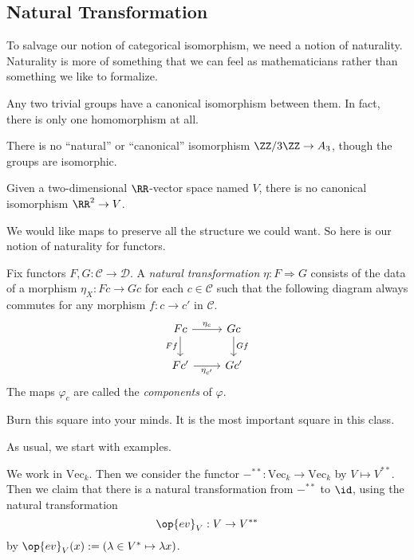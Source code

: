 \subsection{Natural Transformation}
To salvage our notion of categorical isomorphism, we need a notion of naturality. Naturality is more of something that we can feel as mathematicians rather than something we like to formalize.
\begin{example}
	Any two trivial groups have a canonical isomorphism between them. In fact, there is only one homomorphism at all.
\end{example}
\begin{nex}
	There is no ``natural'' or ``canonical'' isomorphism $\ZZ/3\ZZ\to A_3$, though the groups are isomorphic.
\end{nex}
\begin{nex}
	Given a two-dimensional $\RR$-vector space named $V$, there is no canonical isomorphism $\RR^2\to V$.
\end{nex}
We would like maps to preserve all the structure we could want. So here is our notion of naturality for functors.
\begin{definition}
	Fix functors $F,G:\mathcal C\to\mathcal D$. A \textit{natural transformation} $\eta:F\Rightarrow G$ consists of the data of a morphism $\eta_X:Fc\to Gc$ for each $c\in\mathcal C$ such that the following diagram always commutes for any morphism $f:c\to c'$ in $\mathcal C$.
	\[\begin{tikzcd}
		Fc & Gc \\
		{Fc'} & {Gc'}
		\arrow["Ff"', from=1-1, to=2-1]
		\arrow["Gf", from=1-2, to=2-2]
		\arrow["{\eta_c}", from=1-1, to=1-2]
		\arrow["{\eta_{c'}}"', from=2-1, to=2-2]
	\end{tikzcd}\]
	The maps $\varphi_c$ are called the \textit{components} of $\varphi$.
\end{definition}
\begin{quot}
	Burn this square into your minds. It is the most important square in this class.
\end{quot}
As usual, we start with examples.
\begin{exe}
	We work in $\mathrm{Vec}_k$. Then we consider the functor $-^{**}:\mathrm{Vec}_k\to\mathrm{Vec}_k$ by $V\mapsto V^{**}$. Then we claim that there is a natural transformation from $-^{**}$ to $\id$, using the natural transformation
	\[\op{ev}_V:V\to V^{**}\]
	by $\op{ev}_V(x):=(\lambda\in V^*\mapsto\lambda x)$.
\end{exe}
